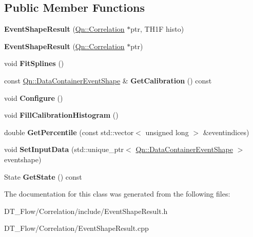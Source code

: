 \subsection*{Public Member Functions}
\begin{DoxyCompactItemize}
\item 
\mbox{\label{classQn_1_1EventShapeResult_a38f78009043029a9d576ed215725c68f}} 
{\bfseries Event\+Shape\+Result} (\mbox{\hyperlink{classQn_1_1Correlation}{Qn\+::\+Correlation}} $\ast$ptr, T\+H1F histo)
\item 
\mbox{\label{classQn_1_1EventShapeResult_ad68afa1261a18c8c199cd18dc9c83628}} 
{\bfseries Event\+Shape\+Result} (\mbox{\hyperlink{classQn_1_1Correlation}{Qn\+::\+Correlation}} $\ast$ptr)
\item 
\mbox{\label{classQn_1_1EventShapeResult_a09e729415756ebf90fdecc43c8e11f6b}} 
void {\bfseries Fit\+Splines} ()
\item 
\mbox{\label{classQn_1_1EventShapeResult_add9cc39867a4d8bb1b18a18ab6f7ed3b}} 
const \mbox{\hyperlink{classQn_1_1DataContainer}{Qn\+::\+Data\+Container\+Event\+Shape}} \& {\bfseries Get\+Calibration} () const
\item 
\mbox{\label{classQn_1_1EventShapeResult_a7b74d348f97e70fd483c3cc8d9667594}} 
void {\bfseries Configure} ()
\item 
\mbox{\label{classQn_1_1EventShapeResult_a77f09db1049efcffa791228783bef74f}} 
void {\bfseries Fill\+Calibration\+Histogram} ()
\item 
\mbox{\label{classQn_1_1EventShapeResult_abdfab557a7efdad7c008f52bc440cb72}} 
double {\bfseries Get\+Percentile} (const std\+::vector$<$ unsigned long $>$ \&eventindices)
\item 
\mbox{\label{classQn_1_1EventShapeResult_aa2ff95d57f72e0b77f2f0182cb33bad0}} 
void {\bfseries Set\+Input\+Data} (std\+::unique\+\_\+ptr$<$ \mbox{\hyperlink{classQn_1_1DataContainer}{Qn\+::\+Data\+Container\+Event\+Shape}} $>$ eventshape)
\item 
\mbox{\label{classQn_1_1EventShapeResult_aeca1778bf874483fb3174ce4ae57f545}} 
State {\bfseries Get\+State} () const
\end{DoxyCompactItemize}


The documentation for this class was generated from the following files\+:\begin{DoxyCompactItemize}
\item 
D\+T\+\_\+\+Flow/\+Correlation/include/Event\+Shape\+Result.\+h\item 
D\+T\+\_\+\+Flow/\+Correlation/Event\+Shape\+Result.\+cpp\end{DoxyCompactItemize}
